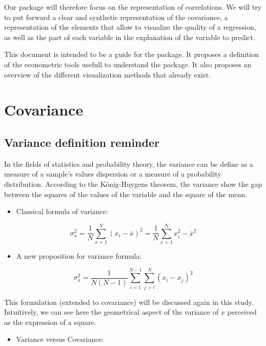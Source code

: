 \documentclass[
]{report}
\providecommand{\tightlist}{%
  \setlength{\itemsep}{0pt}\setlength{\parskip}{0pt}}
\begin{document}
Our package will therefore focus on the representation of correlations. We will try to put forward a clear and synthetic representation of the covariance, a representation of the elements that allow to visualize the quality of a regression, as well as the part of each variable in the explanation of the variable to predict.

This document is intended to be a guide for the package. It proposes a definition of the econometric tools usefull to understand the package. It also proposes an overview of the different visualization methods that already exist.

\hypertarget{covariance}{%
\chapter{Covariance}\label{covariance}}

\hypertarget{variance-definition-reminder}{%
\section{Variance definition reminder}\label{variance-definition-reminder}}

In the fields of statistics and probability theory, the variance can be define as a measure of a sample's values dispersion or a measure of a probability distribution.
According to the König-Huygens theorem, the variance show the gap between the squares of the values of the variable and the square of the mean.

\begin{itemize}
\tightlist
\item
  Classical formula of variance:
\end{itemize}

\[\sigma^2_x=\frac{1}{N}\sum_{x=1}^{N}(x_i - \bar{x})^2 = \frac{1}{N}\sum_{x=1}^{N}x_i^2 - \bar{x}^2\]

\begin{itemize}
\tightlist
\item
  A new proposition for variance formula\citep{Heffernan}:
\end{itemize}

\[\sigma^2_x= \frac{1}{N(N-1)}\sum_{i=1}^{N-1}\sum_{j>i}^{N}(x_i-x_j)^2\]

This formulation (extended to covariance) will be discussed again in this study. Intuitively, we can see here the geometrical aspect of the variance of \(x\) perceived as the expression of a square.

\begin{itemize}
\tightlist
\item
  Variance versus Covariance:
\end{itemize}
\end{document}
